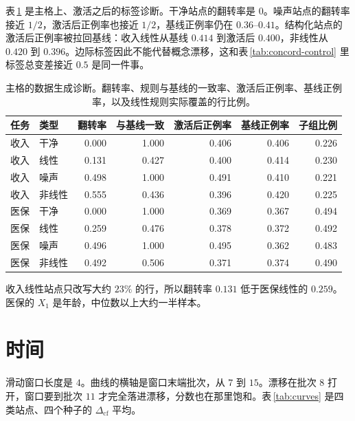 \documentclass[11pt,a4paper,fontset=none]{ctexart}
\newcommand{\Dcf}{\ensuremath{\Delta_{\mathrm{cf}}}}
\begin{document}
表\,\ref{tab:dgp} 是主格上、激活之后的标签诊断。干净站点的翻转率是 \(0\)。噪声站点的翻转率接近 \(1/2\)，激活后正例率也接近 \(1/2\)，基线正例率仍在 \(0.36\)--\(0.41\)。结构化站点的激活后正例率被拉回基线：收入线性从基线 \(0.414\) 到激活后 \(0.400\)，非线性从 \(0.420\) 到 \(0.396\)。边际标签因此不能代替概念漂移，这和表\,\ref{tab:concord-control} 里标签总变差接近 \(0.5\) 是同一件事。

\begin{table}[ht]
\centering
\caption{主格的数据生成诊断。翻转率、规则与基线的一致率、激活后正例率、基线正例率，以及线性规则实际覆盖的行比例。}
\label{tab:dgp}
\small
\begin{tabular}{@{}llrrrrr@{}}
\toprule
任务 & 类型 & 翻转率 & 与基线一致 & 激活后正例率 & 基线正例率 & 子组比例 \\
\midrule
收入 & 干净 & 0.000 & 1.000 & 0.406 & 0.406 & 0.226 \\
收入 & 线性 & 0.131 & 0.427 & 0.400 & 0.414 & 0.230 \\
收入 & 噪声 & 0.498 & 1.000 & 0.491 & 0.410 & 0.221 \\
收入 & 非线性 & 0.555 & 0.436 & 0.396 & 0.420 & 0.225 \\
医保 & 干净 & 0.000 & 1.000 & 0.369 & 0.367 & 0.494 \\
医保 & 线性 & 0.259 & 0.476 & 0.378 & 0.372 & 0.492 \\
医保 & 噪声 & 0.496 & 1.000 & 0.495 & 0.362 & 0.483 \\
医保 & 非线性 & 0.492 & 0.506 & 0.371 & 0.374 & 0.490 \\
\bottomrule
\end{tabular}
\end{table}

收入线性站点只改写大约 \(23\%\) 的行，所以翻转率 \(0.131\) 低于医保线性的 \(0.259\)。医保的 \(X_1\) 是年龄，中位数以上大约一半样本。

\section{时间}

滑动窗口长度是 \(4\)。曲线的横轴是窗口末端批次，从 \(7\) 到 \(15\)。漂移在批次 \(8\) 打开，窗口要到批次 \(11\) 才完全落进漂移，分数也在那里饱和。表\,\ref{tab:curves} 是四类站点、四个种子的 \(\Dcf\) 平均。
\end{document}
